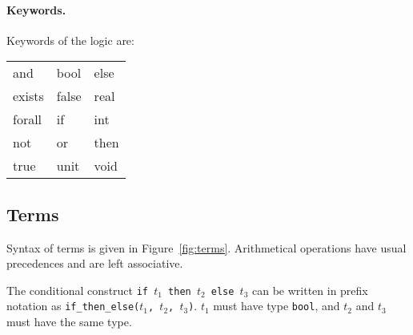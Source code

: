 \documentclass[a4paper,12pt]{report}
\begin{document}
\paragraph{Keywords.}

Keywords of the logic are:
\begin{center}
{\tt\begin{tabular}{l@{\qquad}l@{\qquad}l}
and & bool & else \\
exists & false & real \\
forall & if & int  \\
not & or & then  \\
true & unit & void
\end{tabular}}
\end{center}


\subsection{Terms}
\label{syntax:terms}

Syntax of terms is given in Figure~\ref{fig:terms}.
Arithmetical operations have usual precedences and are left associative.

The conditional construct \texttt{if $t_1$ then $t_2$ else $t_3$} can
be written in prefix notation as \texttt{if\_then\_else($t_1$, $t_2$,
  $t_3$)}. $t_1$ must have type \texttt{bool}, and $t_2$ and $t_3$ must
have the same type.
\end{document}
